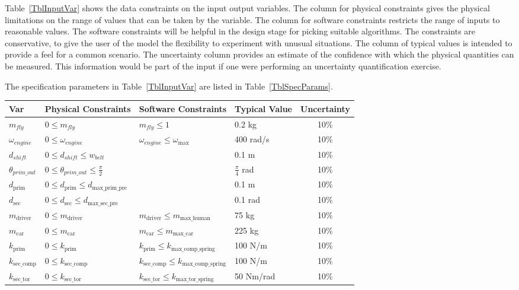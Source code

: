 \documentclass[12pt]{article}
\begin{document}
Table~\ref{TblInputVar} shows the data constraints on the input output
variables.  The column for physical constraints gives the physical limitations
on the range of values that can be taken by the variable.  The column for
software constraints restricts the range of inputs to reasonable values.  The
software constraints will be helpful in the design stage for picking suitable
algorithms.  The constraints are conservative, to give the user of the model the
flexibility to experiment with unusual situations.  The column of typical values
is intended to provide a feel for a common scenario.  The uncertainty column
provides an estimate of the confidence with which the physical quantities can be
measured.  This information would be part of the input if one were performing an
uncertainty quantification exercise.

The specification parameters in Table~\ref{TblInputVar} are listed in
Table~\ref{TblSpecParams}.

\begin{table}[H]
  \caption{Input Variables} \label{TblInputVar}
  \renewcommand{\arraystretch}{1.2}
\noindent \begin{longtable*}{l l l l c} 
  \toprule
  \textbf{Var} & \textbf{Physical Constraints} & \textbf{Software Constraints} &
                             \textbf{Typical Value} & \textbf{Uncertainty}\\
  \midrule 
  $m_{fly}$ & $0 \leq m_{fly}$ & $m_{fly} \leq 1$ & 0.2 kg & 10\%\\
  $\omega_{engine}$ & $0 \leq \omega_{engine}$ & $\omega_{engine} \leq \omega_\text{max}$ & 400 rad/s & 10\%\\
  $d_{shift}$ & $0 \leq d_{shift} \leq w_{belt}$ & & 0.1 m & 10\%\\
  $\theta_{prim\_out}$ & $0 \leq \theta_{prim\_out} \leq \frac{\pi}{2}$ & & $\frac{\pi}{4}$ rad & 10\%\\
  $d_{\text{prim}}$ & $0 \leq d_{\text{prim}} \leq d_\text{max\_prim\_pre}$ & & 0.1 m & 10\%\\
  $d_{\text{sec}}$ & $0 \leq d_{\text{sec}} \leq d_\text{max\_sec\_pre}$ & & 0.1 rad & 10\%\\
  $m_{\text{driver}}$ & $0 \leq m_{\text{driver}}$ & $ m_{\text{driver}} \leq m_\text{max\_human}$ & 75 kg & 10\%\\
  $m_{\text{car}}$ & $0 \leq m_{\text{car}}$ & $m_{\text{car}} \leq m_\text{max\_car}$ & 225 kg & 10\%\\
  $k_{\text{prim}}$ & $0 \leq k_{\text{prim}}$ & $k_{\text{prim}} \leq k_\text{max\_comp\_spring}$ & 100 N/m & 10\%\\
  $k_{\text{sec\_comp}}$ & $0 \leq k_{\text{sec\_comp}}$ & $k_{\text{sec\_comp}} \leq k_\text{max\_comp\_spring}$ & 100 N/m & 10\%\\
  $k_{\text{sec\_tor}}$ & $0 \leq k_{\text{sec\_tor}}$ & $k_{\text{sec\_tor}} \leq k_\text{max\_tor\_spring}$ & 50 Nm/rad & 10\%\\
  \bottomrule
\end{longtable*}
\end{table}
\end{document}
